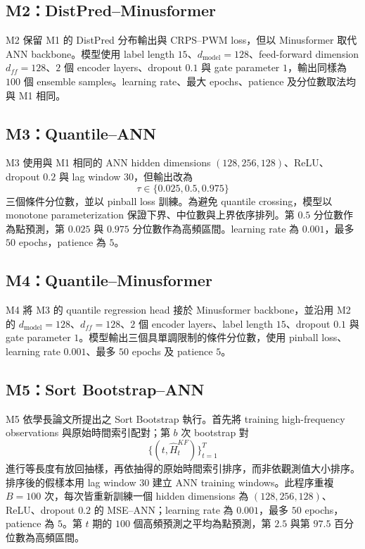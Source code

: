 \subsection{M2：DistPred--Minusformer}
\label{subsec:m2-method}

M2 保留 M1 的 DistPred 分布輸出與 CRPS--PWM loss，但以 Minusformer 取代 ANN backbone。模型使用 label length $15$、$d_{\mathrm{model}}=128$、feed-forward dimension $d_{ff}=128$、$2$ 個 encoder layers、dropout $0.1$ 與 gate parameter $1$，輸出同樣為 $100$ 個 ensemble samples。learning rate、最大 epochs、patience 及分位數取法均與 M1 相同。

\subsection{M3：Quantile--ANN}
\label{subsec:m3-method}

M3 使用與 M1 相同的 ANN hidden dimensions $(128,256,128)$、ReLU、dropout $0.2$ 與 lag window $30$，但輸出改為
\[
    \tau\in\{0.025,0.5,0.975\}
\]
三個條件分位數，並以 pinball loss 訓練。為避免 quantile crossing，模型以 monotone parameterization 保證下界、中位數與上界依序排列。第 $0.5$ 分位數作為點預測，第 $0.025$ 與 $0.975$ 分位數作為高頻區間。learning rate 為 $0.001$，最多 $50$ epochs，patience 為 $5$。

\subsection{M4：Quantile--Minusformer}
\label{subsec:m4-method}

M4 將 M3 的 quantile regression head 接於 Minusformer backbone，並沿用 M2 的 $d_{\mathrm{model}}=128$、$d_{ff}=128$、$2$ 個 encoder layers、label length $15$、dropout $0.1$ 與 gate parameter $1$。模型輸出三個具單調限制的條件分位數，使用 pinball loss、learning rate $0.001$、最多 $50$ epochs 及 patience $5$。

\subsection{M5：Sort Bootstrap--ANN}
\label{subsec:m5-method}

M5 依學長論文所提出之 Sort Bootstrap 執行。首先將 training high-frequency observations 與原始時間索引配對；第 $b$ 次 bootstrap 對
\[
    \{(t,\widehat H_t^{KF})\}_{t=1}^{T}
\]
進行等長度有放回抽樣，再依抽得的原始時間索引排序，而非依觀測值大小排序。排序後的假樣本用 lag window $30$ 建立 ANN training windows。此程序重複 $B=100$ 次，每次皆重新訓練一個 hidden dimensions 為 $(128,256,128)$、ReLU、dropout $0.2$ 的 MSE--ANN；learning rate 為 $0.001$，最多 $50$ epochs，patience 為 $5$。第 $t$ 期的 $100$ 個高頻預測之平均為點預測，第 $2.5$ 與第 $97.5$ 百分位數為高頻區間。

